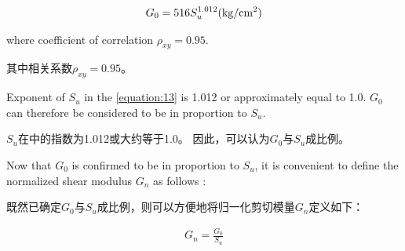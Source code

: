 \begin{align}
    G_0=516S_u^{1.012}(\rm{kg/cm^2})
    \label{equation:13}
\end{align}



\begin{paracol}{2}

    \noindent{}where coefficient of correlation $\rho_{xy}=0.95$.

    \switchcolumn
    
    \noindent{}其中相关系数$\rho_{xy}=0.95$。

    \switchcolumn*

    Exponent of $S_u$ in the \autoref{equation:13} is 1.012 or approximately equal to 1.0. $G_0$ can therefore be considered to be in proportion to $S_u$.

    \switchcolumn

    $S_u$在中的指数为1.012或大约等于1.0。 因此，可以认为$G_0$与$S_u$成比例。

\end{paracol}


\begin{paracol}{2}
    
    Now that $G_0$ is confirmed to be in proportion to $S_u$, it is convenient to define the normalized shear modulus $G_n$ as follows :

    \switchcolumn

    既然已确定$G_0$与$S_u$成比例，则可以方便地将归一化剪切模量$G_n$定义如下：

\end{paracol}

\begin{align}
    G_n=\frac{G_0}{S_u}
    \label{equation:14}
\end{align}

